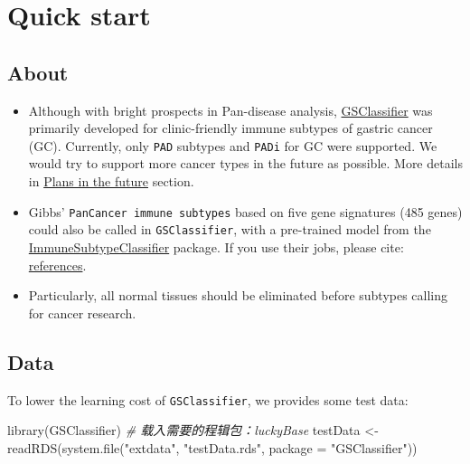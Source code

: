 \documentclass[
  12pt,
]{book}
\newenvironment{Shaded}{\begin{snugshade}}{\end{snugshade}}
\newcommand{\AttributeTok}[1]{\textcolor[rgb]{0.77,0.63,0.00}{#1}}
\newcommand{\CommentTok}[1]{\textcolor[rgb]{0.56,0.35,0.01}{\textit{#1}}}
\newcommand{\FunctionTok}[1]{\textcolor[rgb]{0.00,0.00,0.00}{#1}}
\newcommand{\NormalTok}[1]{#1}
\newcommand{\OtherTok}[1]{\textcolor[rgb]{0.56,0.35,0.01}{#1}}
\newcommand{\StringTok}[1]{\textcolor[rgb]{0.31,0.60,0.02}{#1}}
\providecommand{\tightlist}{%
  \setlength{\itemsep}{0pt}\setlength{\parskip}{0pt}}
\begin{document}
\hypertarget{quick-start}{%
\chapter{Quick start}\label{quick-start}}

\hypertarget{about}{%
\section{About}\label{about}}

\begin{itemize}
\tightlist
\item
  Although with bright prospects in Pan-disease analysis, \href{https://github.com/huangwb8/GSClassifier}{GSClassifier} was primarily developed for clinic-friendly immune subtypes of gastric cancer (GC). Currently, only \texttt{PAD} subtypes and \texttt{PADi} for GC were supported. We would try to support more cancer types in the future as possible. More details in \href{https://github.com/huangwb8/GSClassifier/wiki/Plans-in-the-future}{Plans in the future} section.
\item
  Gibbs' \texttt{PanCancer\ immune\ subtypes} based on five gene signatures (485 genes) could also be called in \texttt{GSClassifier}, with a pre-trained model from the \href{https://github.com/CRI-iAtlas/ImmuneSubtypeClassifier}{ImmuneSubtypeClassifier} package. If you use their jobs, please cite: \href{https://github.com/huangwb8/GSClassifier/wiki/Introduction\#Reference}{references}.
\item
  Particularly, all normal tissues should be eliminated before subtypes calling for cancer research.
\end{itemize}

\hypertarget{data}{%
\section{Data}\label{data}}

To lower the learning cost of \texttt{GSClassifier}, we provides some test data:

\begin{Shaded}
\begin{Highlighting}[]
\FunctionTok{library}\NormalTok{(GSClassifier)}
\CommentTok{\# 载入需要的程辑包：luckyBase}
\NormalTok{testData }\OtherTok{\textless{}{-}} \FunctionTok{readRDS}\NormalTok{(}\FunctionTok{system.file}\NormalTok{(}\StringTok{"extdata"}\NormalTok{, }\StringTok{"testData.rds"}\NormalTok{, }\AttributeTok{package =} \StringTok{"GSClassifier"}\NormalTok{))}
\end{Highlighting}
\end{Shaded}
\end{document}
